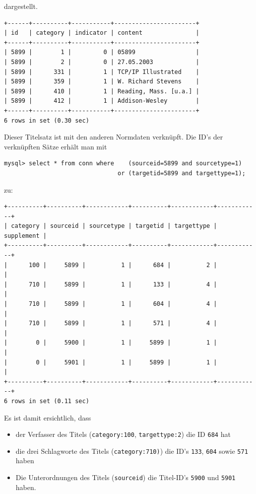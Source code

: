 \documentclass[11pt, twoside, a4paper, BCOR8mm, DIV12, bibtotoc,idxtotoc]{scrbook}
\begin{document}
dargestellt.

\begin{verbatim}
+------+----------+-----------+-----------------------+
| id   | category | indicator | content               |
+------+----------+-----------+-----------------------+
| 5899 |        1 |         0 | 05899                 |
| 5899 |        2 |         0 | 27.05.2003            |
| 5899 |      331 |         1 | TCP/IP Illustrated    |
| 5899 |      359 |         1 | W. Richard Stevens    |
| 5899 |      410 |         1 | Reading, Mass. [u.a.] |
| 5899 |      412 |         1 | Addison-Wesley        |
+------+----------+-----------+-----------------------+
6 rows in set (0.30 sec)
\end{verbatim}

Dieser Titelsatz ist mit den anderen Normdaten verknüpft. Die ID's der
verknüpften Sätze erhält man mit

\begin{verbatim}
mysql> select * from conn where    (sourceid=5899 and sourcetype=1) 
                                or (targetid=5899 and targettype=1);
\end{verbatim}

zu:

\begin{verbatim}
+----------+----------+------------+----------+------------+------------+
| category | sourceid | sourcetype | targetid | targettype | supplement |
+----------+----------+------------+----------+------------+------------+
|      100 |     5899 |          1 |      684 |          2 |            |
|      710 |     5899 |          1 |      133 |          4 |            |
|      710 |     5899 |          1 |      604 |          4 |            |
|      710 |     5899 |          1 |      571 |          4 |            |
|        0 |     5900 |          1 |     5899 |          1 |            |
|        0 |     5901 |          1 |     5899 |          1 |            |
+----------+----------+------------+----------+------------+------------+
6 rows in set (0.11 sec)
\end{verbatim}

Es ist damit ersichtlich, dass 

\begin{itemize}
\item der Verfasser des Titels (\texttt{category:100}, \texttt{targettype:2}) die ID \texttt{684} hat
\item die drei Schlagworte des Titels (\texttt{category:710)}) die ID's
  \texttt{133}, \texttt{604} sowie \texttt{571} haben
\item Die Unterordnungen des Titels (\texttt{sourceid}) die Titel-ID's
  \texttt{5900} und \texttt{5901} haben.
\end{itemize}
\end{document}
